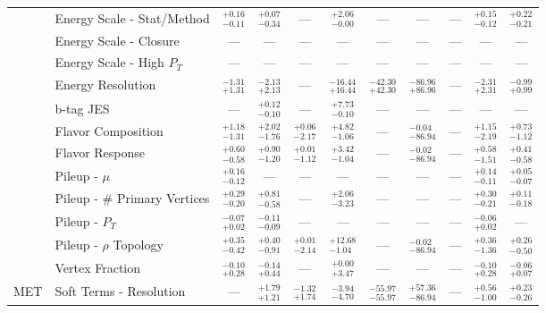 \begin{tabular}{|cl||ccccccc|c||c|}
\cline{2-11}
&Energy Scale - Stat/Method &  $^{+0.16}_{-0.11}$  &  $^{+0.07}_{-0.34}$  & --- &  $^{+2.06}_{-0.00}$  & --- & --- & --- &  $^{+0.15}_{-0.12}$  &  $^{+0.22}_{-0.21}$ \\ 
\cline{2-11}
&Energy Scale - Closure & --- & --- & --- & --- & --- & --- & --- & --- & ---\\ 
\cline{2-11}
&Energy Scale - High $P_{T}$ & --- & --- & --- & --- & --- & --- & --- & --- & ---\\ 
\cline{2-11}
&Energy Resolution &  $^{-1.31}_{+1.31}$  &  $^{-2.13}_{+2.13}$  & --- &  $^{-16.44}_{+16.44}$  &  $^{-42.30}_{+42.30}$  &  $^{-86.96}_{+86.96}$  & --- &  $^{-2.31}_{+2.31}$  &  $^{-0.99}_{+0.99}$ \\ 
\cline{2-11}
&b-tag JES & --- &  $^{+0.12}_{-0.10}$  & --- &  $^{+7.73}_{-0.10}$  & --- & --- & --- & --- & ---\\ 
\cline{2-11}
&Flavor Composition &  $^{+1.18}_{-1.31}$  &  $^{+2.02}_{-1.76}$  &  $^{+0.06}_{-2.17}$  &  $^{+4.82}_{-1.06}$  & --- &  $^{-0.04}_{-86.94}$  & --- &  $^{+1.15}_{-2.19}$  &  $^{+0.73}_{-1.12}$ \\ 
\cline{2-11}
&Flavor Response &  $^{+0.60}_{-0.58}$  &  $^{+0.90}_{-1.20}$  &  $^{+0.01}_{-1.12}$  &  $^{+3.42}_{-1.04}$  & --- &  $^{-0.02}_{-86.94}$  & --- &  $^{+0.58}_{-1.51}$  &  $^{+0.41}_{-0.58}$ \\ 
\cline{2-11}
&Pileup - $\mu$ &  $^{+0.16}_{-0.12}$  & --- & --- & --- & --- & --- & --- &  $^{+0.14}_{-0.11}$  &  $^{+0.05}_{-0.07}$ \\ 
\cline{2-11}
&Pileup - \# Primary Vertices &  $^{+0.29}_{-0.20}$  &  $^{+0.81}_{-0.58}$  & --- &  $^{+2.06}_{-3.23}$  & --- & --- & --- &  $^{+0.30}_{-0.21}$  &  $^{+0.11}_{-0.18}$ \\ 
\cline{2-11}
&Pileup -  $P_{T}$ &  $^{-0.07}_{+0.02}$  &  $^{-0.11}_{-0.09}$  & --- & --- & --- & --- & --- &  $^{-0.06}_{+0.02}$  & ---\\ 
\cline{2-11}
&Pileup - $\rho$ Topology &  $^{+0.35}_{-0.42}$  &  $^{+0.40}_{-0.91}$  &  $^{+0.01}_{-2.14}$  &  $^{+12.68}_{-1.04}$  & --- &  $^{-0.02}_{-86.94}$  & --- &  $^{+0.36}_{-1.36}$  &  $^{+0.26}_{-0.50}$ \\ 
\cline{2-11}
&Vertex Fraction &  $^{-0.10}_{+0.28}$  &  $^{-0.14}_{+0.44}$  & --- &  $^{+0.00}_{+3.47}$  & --- & --- & --- &  $^{-0.10}_{+0.28}$  &  $^{-0.06}_{+0.07}$ \\ 
\hline
\multirow{2}{*}{MET}
&Soft Terms - Resolution & --- &  $^{+1.79}_{+1.21}$  &  $^{-1.32}_{+1.74}$  &  $^{-3.94}_{-4.70}$  &  $^{-55.97}_{-55.97}$  &  $^{+57.36}_{-86.94}$  & --- &  $^{+0.56}_{-1.00}$  &  $^{+0.23}_{-0.26}$ \\ 

\end{tabular}
